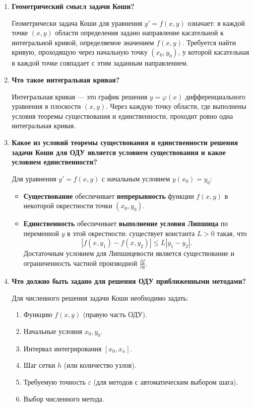 \documentclass[a4paper,12pt]{article}
\begin{document}
\begin{enumerate}
\item \textbf{Геометрический смысл задачи Коши?}

Геометрически задача Коши для уравнения \( y' = f(x, y) \) означает: в каждой точке \( (x, y) \) области определения задано направление касательной к интегральной кривой, определяемое значением \( f(x, y) \). Требуется найти кривую, проходящую через начальную точку \( (x_0, y_0) \), у которой касательная в каждой точке совпадает с этим заданным направлением.

\item \textbf{Что такое интегральная кривая?}

Интегральная кривая — это график решения \( y = \varphi(x) \) дифференциального уравнения в плоскости \( (x, y) \). Через каждую точку области, где выполнены условия теоремы существования и единственности, проходит ровно одна интегральная кривая.

\item \textbf{Какое из условий теоремы существования и единственности решения задачи Коши для ОДУ является условием существования и какое условием единственности?}

Для уравнения \( y' = f(x, y) \) с начальным условием \( y(x_0) = y_0 \):
\begin{itemize}
    \item \textbf{Существование} обеспечивает \textbf{непрерывность} функции \( f(x, y) \) в некоторой окрестности точки \( (x_0, y_0) \).
    \item \textbf{Единственность} обеспечивает \textbf{выполнение условия Липшица} по переменной \( y \) в этой окрестности: существует константа \( L > 0 \) такая, что
    \[
    |f(x, y_1) - f(x, y_2)| \le L |y_1 - y_2|.
    \]
    Достаточным условием для Липшицевости является существование и ограниченность частной производной \( \frac{\partial f}{\partial y} \).
\end{itemize}

\item \textbf{Что должно быть задано для решения ОДУ приближенными методами?}

Для численного решения задачи Коши необходимо задать:
\begin{enumerate}
    \item Функцию \( f(x, y) \) (правую часть ОДУ).
    \item Начальные условия \( x_0, y_0 \).
    \item Интервал интегрирования \( [x_0, x_n] \).
    \item Шаг сетки \( h \) (или количество узлов).
    \item Требуемую точность \( \varepsilon \) (для методов с автоматическим выбором шага).
    \item Выбор численного метода.
\end{enumerate}


\end{enumerate}
\end{document}
